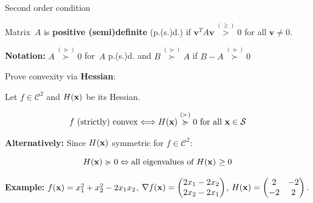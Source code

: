 \documentclass[11pt,compress,t,notes=noshow, xcolor=table]{beamer}
\begin{document}
\begin{vbframe}{Second order condition}

Matrix~$A$ is \textbf{positive (semi)definite} (p.(s.)d.) if $\bm{v}^T A \bm{v} \overset{(\geq)}{>} 0$ for all $\bm{v}\not=0.$

\medskip

\textbf{Notation:} $A \overset{(\succcurlyeq)}{\succ} 0$ for~$A$ p.(s.)d. and $B \overset{(\succcurlyeq)}{\succ} A$ if $B-A \overset{(\succcurlyeq)}{\succ} 0$

\lz

Prove convexity via \textbf{Hessian}:


    Let $f \in \mathcal{C}^2$ and $H(\mathbf{x})$ be its Hessian.

    \vspace{-\baselineskip}

    \begin{gather*}
        \textnormal{$f$ (strictly) convex} \Longleftrightarrow H(\mathbf{x}) \overset{(\succ)}{\succcurlyeq} 0 \textnormal{ for all $\mathbf{x} \in \mathcal{S}$}
    \end{gather*}


\textbf{Alternatively:} Since $H(\mathbf{x})$ symmetric for $f \in \mathcal{C}^2$:

\vspace{-0.5\baselineskip}

\begin{equation*}
    H(\mathbf{x}) \succcurlyeq 0 \Leftrightarrow \textnormal{all eigenvalues of $H(\mathbf{x})$ $\ge 0$}
\end{equation*}

\framebreak



\begin{footnotesize}
\textbf{Example:} $f(\mathbf{x}) = x_1^2 + x_2^2 - 2x_1x_2$, $\nabla f(\mathbf{x}) = \begin{pmatrix}2x_1 - 2x_2 \\ 2x_2 - 2x_1\end{pmatrix}$, $H(\mathbf{x}) = \begin{pmatrix} 2 & -2 \\ -2 & 2 \end{pmatrix}.
$


\end{footnotesize}
\end{vbframe}
\end{document}
